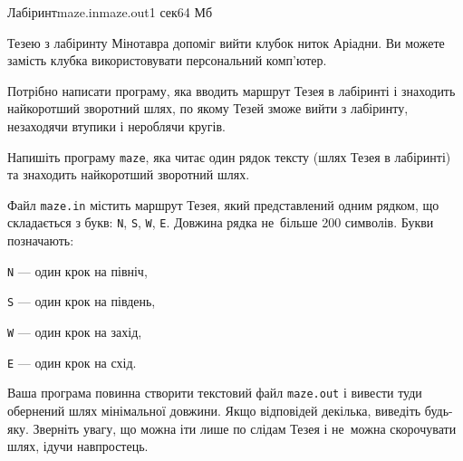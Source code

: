 \begin{problem}{Лабіринт}{maze.in}{maze.out}{1 сек}{64 Мб}

Тезею з лабіринту Мінотавра допоміг вийти клубок ниток Аріадни. Ви можете замість
клубка використовувати персональний комп'ютер.

Потрібно написати програму, яка вводить маршрут Тезея в лабіринті і знаходить
найкоротший зворотний шлях, по якому Тезей зможе вийти з лабіринту, не\nolinebreak[3] заходячи в\nolinebreak[2]
тупики і не\nolinebreak[3] роблячи кругів.

\Task 
Напишіть програму \texttt{maze}, яка читає один рядок тексту (шлях Тезея в лабіринті)
та знаходить найкоротший зворотний шлях.

\InputFile
Файл \texttt{maze.in} містить маршрут Тезея, який представлений одним рядком, що
складається з букв: \texttt{N}, \texttt{S}, \texttt{W}, \texttt{Е}. Довжина рядка не~більше 200 символів.
Букви позначають:

\vspace{-0.5\baselineskip}

\begin{multicols}{2}
\par\texttt{N} --- один крок на північ,
\par\texttt{S} --- один крок на південь,
\par\texttt{W} --- один крок на захід,
\par\texttt{E} --- один крок на схід.
\end{multicols}

\vspace{-0.5\baselineskip}

\OutputFile
Ваша програма повинна створити текстовий файл \texttt{maze.out} і вивести туди
обернений шлях мінімальної довжини. Якщо відповідей декілька, виведіть будь-яку.
Зверніть увагу, що можна іти лише по слідам Тезея і не~можна скорочувати шлях, ідучи
навпростець.

\Example
\begin{exampleWidthsAndDefaultFileNames}{5em}{3em}%
%
\end{exampleWidthsAndDefaultFileNames}

\end{problem}
